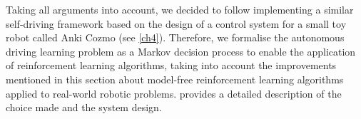 Taking all arguments into account, we decided to follow \cite{kendall2019learning} implementing a similar self-driving framework based on the design of a control system for a small toy robot called Anki Cozmo (see \vref{ch4}). Therefore, we formalise the autonomous driving learning problem as a Markov decision process to enable the application of reinforcement learning algorithms, taking into account the improvements mentioned in this section about model-free reinforcement learning algorithms applied to real-world robotic problems.  provides a detailed description of the choice made and the system design.







